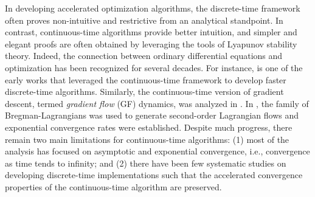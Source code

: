 \documentclass[letterpaper]{article}
\begin{document}

In developing accelerated optimization algorithms, the discrete-time framework often proves non-intuitive and restrictive from an analytical standpoint. In contrast, continuous-time algorithms provide better intuition, and simpler and elegant proofs are often obtained by leveraging the tools of Lyapunov stability theory.
Indeed, the connection between ordinary differential equations and optimization has been recognized for several decades. For instance, \cite{brown1989} is one of the early works that leveraged the continuous-time framework to develop faster discrete-time algorithms. Similarly, the continuous-time version of gradient descent, termed {\it gradient flow} (GF) dynamics, was analyzed in \cite{su2016}. In \cite{andre2016}, the family of Bregman-Lagrangians was used to generate second-order Lagrangian flows and exponential convergence rates were established. Despite much progress, there remain two main limitations for continuous-time algorithms: (1) most of the analysis has focused on asymptotic and exponential convergence, i.e., convergence as time tends to infinity; and (2) there have been few systematic studies on developing discrete-time implementations such that the accelerated convergence properties of the continuous-time algorithm are preserved.

\end{document}
